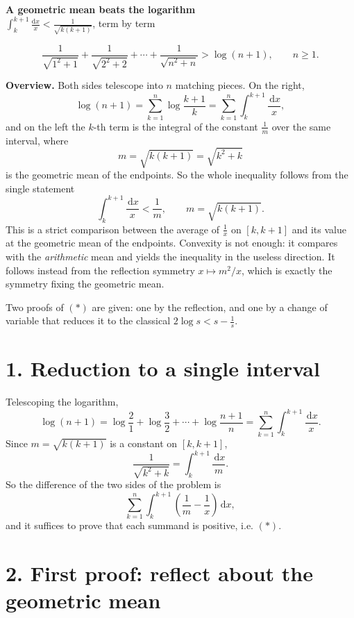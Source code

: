 \documentclass[12pt]{article}
\newcommand{\dd}{\,\mathrm{d}}
\newcommand{\Mid}{m}
\begin{document}
\begin{center}
{\Large\bfseries A geometric mean beats the logarithm}\\[0.35em]
{\large \(\displaystyle\int_k^{k+1}\frac{\mathrm dx}{x}<\frac1{\sqrt{k(k+1)}}\), term by term}
\end{center}

\[
\boxed{\displaystyle
\frac1{\sqrt{1^2+1}}+\frac1{\sqrt{2^2+2}}+\cdots+\frac1{\sqrt{n^2+n}}
>\log(n+1),\qquad n\ge1 .}
\]

\textbf{Overview.}
Both sides telescope into \(n\) matching pieces. On the right,
\[
\log(n+1)=\sum_{k=1}^{n}\log\frac{k+1}{k}
=\sum_{k=1}^{n}\int_k^{k+1}\frac{\dd x}{x},
\]
and on the left the \(k\)-th term is the integral of the constant
\(\frac1{\Mid}\) over the same interval, where
\[
\Mid=\sqrt{k(k+1)}=\sqrt{k^2+k}
\]
is the geometric mean of the endpoints. So the whole inequality follows
from the single statement
\[
\int_k^{k+1}\frac{\dd x}{x}<\frac1{\Mid},
\qquad \Mid=\sqrt{k(k+1)} .
\tag{$\ast$}
\]
This is a strict comparison between the average of \(\frac1x\) on
\([k,k+1]\) and its value at the geometric mean of the endpoints.
Convexity is not enough: it compares with the \emph{arithmetic} mean and
yields the inequality in the useless direction. It follows instead from the reflection symmetry
\(x\mapsto\Mid^2/x\), which is exactly the symmetry fixing the geometric
mean.

Two proofs of \((\ast)\) are given: one by the reflection, and one by a
change of variable that reduces it to the classical
\(2\log s<s-\frac1s\).

\section*{1. Reduction to a single interval}

Telescoping the logarithm,
\[
\log(n+1)=\log\frac21+\log\frac32+\cdots+\log\frac{n+1}{n}
=\sum_{k=1}^{n}\int_k^{k+1}\frac{\dd x}{x} .
\tag{1}
\]
Since \(\Mid=\sqrt{k(k+1)}\) is a constant on \([k,k+1]\),
\[
\frac1{\sqrt{k^2+k}}=\int_k^{k+1}\frac{\dd x}{\Mid} .
\tag{2}
\]
So the difference of the two sides of the problem is
\[
\sum_{k=1}^{n}\int_k^{k+1}\left(\frac1{\Mid}-\frac1x\right)\dd x ,
\]
and it suffices to prove that each summand is positive, i.e. \((\ast)\).

\section*{2. First proof: reflect about the geometric mean}
\end{document}
